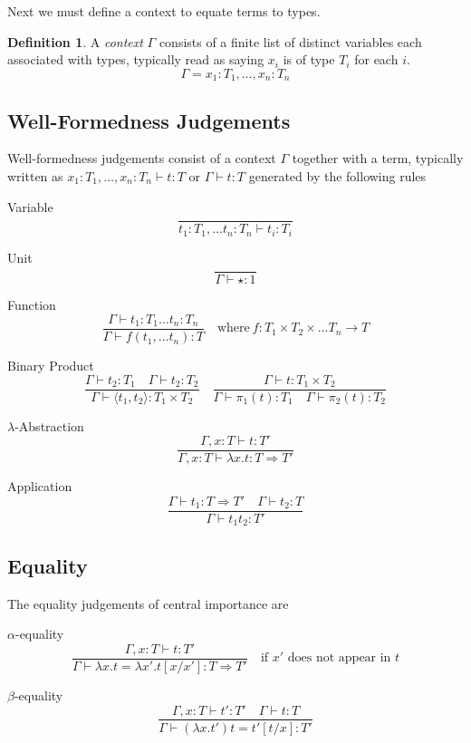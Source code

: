 \documentclass{article}
\theoremstyle{definition}
\newtheorem{definition}{Definition}[section]
\begin{document}
\vspace{4mm}
Next we must define a context to equate terms to types.

\begin{definition}
A \textit{context} $\Gamma$ consists of a finite list of distinct variables each associated with types,
    typically read as saying $x_i$ is of type $T_i$ for each $i$.
    $$\Gamma =x_1 :T_1,\dots,x_n :T_n$$
\end{definition}

\subsection{Well-Formedness Judgements}
Well-formedness judgements consist of a context $\Gamma$ together with a term,
typically written as $x_1 :T_1,\dots, x_n :T_n \vdash t : T$ or $\Gamma \vdash t:T$
generated by the following rules 

Variable
$$
\frac{}{t_1 : T_1, \dots t_n : T_n \vdash t_i : T_i}
$$

Unit
$$
\frac{}{\Gamma \vdash \star : 1}
$$

Function
$$
\frac{\Gamma \vdash t_1 : T_1 \dots t_n : T_n}{\Gamma \vdash f(t_1,\dots t_n) : T}
\quad\textrm{where}\ f : T_1 \times T_2 \times \dots T_n \rightarrow T
$$

Binary Product
$$
\frac
{\Gamma \vdash t_2 : T_1 \quad \Gamma \vdash t_2 : T_2}
{\Gamma \vdash \langle t_1, t_2 \rangle : T_1 \times T_2}
\quad
\frac
{\Gamma \vdash t : T_1 \times T_2}
{\Gamma \vdash \pi_1(t) : T_1 \quad \Gamma \vdash \pi_2(t) : T_2}
$$

$\lambda$-Abstraction
$$
\frac
{\Gamma, x : T \vdash t : T\prime}
{\Gamma, x : T \vdash \lambda x.t : T \Rightarrow T\prime}
$$

Application
$$
\frac
{\Gamma \vdash t_1 : T \Rightarrow T\prime \quad \Gamma \vdash t_2 : T}
{\Gamma \vdash t_1 t_2 : T\prime}
$$

\subsection{Equality}
The equality judgements of central importance are

$\alpha$-equality
$$
\frac
{\Gamma, x : T \vdash t : T\prime}
{\Gamma \vdash \lambda x.t = \lambda x\prime.t[x/x\prime] : T \Rightarrow T\prime}
\quad
\textrm{if $x\prime$ does not appear in $t$}
$$

$\beta$-equality
$$
\frac
{\Gamma, x : T \vdash t\prime : T\prime \quad \Gamma \vdash t : T}
{\Gamma \vdash (\lambda x.t\prime)t = t\prime[t/x]: T\prime }
$$
\end{document}
